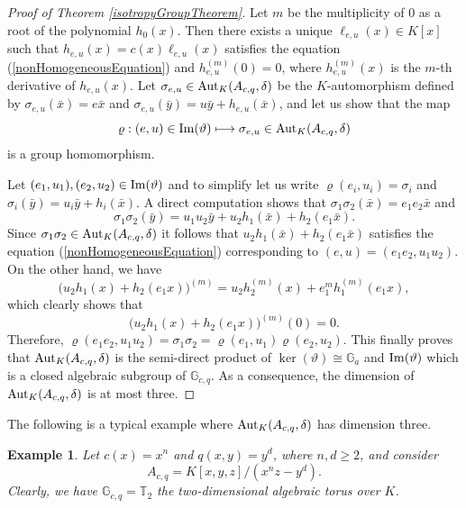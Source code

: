 \documentclass{article}
\newcommand \G {\mathbb{G}}
\newcommand \T {\mathbb{T}}
\renewcommand \a {A}
\renewcommand \k {K}
\newcommand \auto {{\rm Aut}}
\newcommand \image {{\rm Im}}
\newtheorem{example}[theorem]{Example}
\begin{document}
{\begin{proof}[Proof of Theorem \ref{isotropyGroupTheorem}]
	\medskip Let $m$ be the multiplicity of $0$ as a root of the polynomial $h_0(x)$. Then there exists a unique $\ell_{e,u}(x)\in\k[x]$ such that $h_{e,u}(x)=c(x)\ell_{e,u}(x)$ satisfies the equation (\ref{nonHomogeneousEquation}) and $h_{e,u}^{(m)}(0)=0$, where $h_{e,u}^{(m)}(x)$ is the $m$-th derivative of $h_{e,u}(x)$. Let $\sigma_{e,u}\in\auto_{\k}(\a_{c,q},\delta)$ be the $\k$-automorphism defined by $\sigma_{e,u}(\bar{x})=e\bar{x}$ and $\sigma_{e,u}(\bar{y})=u\bar{y}+h_{e,u}(\bar{x})$, and let us show that the map $$\varrho:(e,u)\in\image(\vartheta)\longmapsto \sigma_{e,u}\in\auto_{\k}(\a_{c,q},\delta)$$ is a group homomorphism.
	
	\medskip Let $(e_1,u_1),(e_2,u_2)\in\image(\vartheta)$ and to simplify let us write $\varrho(e_i,u_i)=\sigma_i$ and $\sigma_i(\bar{y})=u_i\bar{y}+h_i(\bar{x})$. A direct computation shows that $\sigma_1\sigma_2(\bar{x})=e_1e_2\bar{x}$ and $$\sigma_1\sigma_2(\bar{y})=u_1u_2\bar{y}+u_2h_1(\bar{x})+h_2(e_1\bar{x}).$$ Since $\sigma_1\sigma_2\in\auto_{\k}(\a_{c,q},\delta)$ it follows that $u_2h_1(\bar{x})+h_2(e_1\bar{x})$ satisfies the equation (\ref{nonHomogeneousEquation}) corresponding to $(e,u)=(e_1e_2,u_1u_2)$. On the other hand, we have $$\big(u_2h_1(x)+h_2(e_1x)\big)^{(m)}=u_2h_2^{(m)}(x)+e_1^mh_1^{(m)}(e_1x),$$ which clearly shows that $$\big(u_2h_1(x)+h_2(e_1x)\big)^{(m)}(0)=0.$$ Therefore, $\varrho(e_1e_2,u_1u_2)=\sigma_1\sigma_2=\varrho(e_1,u_1)\varrho(e_2,u_2)$. This finally proves that $\auto_{\k}(\a_{c,q},\delta)$ is the semi-direct product of $\ker(\vartheta)\cong \G_a$ and $\image(\vartheta)$ which is a closed algebraic subgroup of $\G_{c,q}$. As a consequence, the dimension of $\auto_{\k}(\a_{c,q},\delta)$ is at most three.
\end{proof}

The following is a typical example where $\auto_{\k}(\a_{c,q},\delta)$ has dimension three.
\begin{example}Let $c(x)=x^n$ and $q(x,y)=y^d$, where $n,d\geq 2$, and consider $$\a_{c,q}=\k[x,y,z]/(x^nz-y^d).$$ Clearly, we have $\G_{c,q}=\T_2$ the two-dimensional algebraic torus over $\k$.
	

\end{example}}
\end{document}
